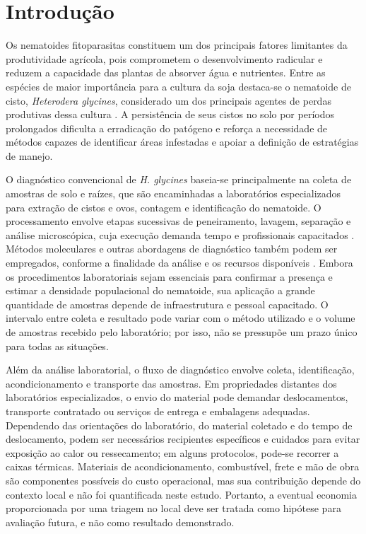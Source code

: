 \section{Introdução}

Os nematoides fitoparasitas constituem um dos principais fatores limitantes da produtividade agrícola, pois comprometem o desenvolvimento radicular e reduzem a capacidade das plantas de absorver água e nutrientes. Entre as espécies de maior importância para a cultura da soja destaca-se o nematoide de cisto, \textit{Heterodera glycines}, considerado um dos principais agentes de perdas produtivas dessa cultura \cite{bent2022}. A persistência de seus cistos no solo por períodos prolongados dificulta a erradicação do patógeno e reforça a necessidade de métodos capazes de identificar áreas infestadas e apoiar a definição de estratégias de manejo.

O diagnóstico convencional de \textit{H. glycines} baseia-se principalmente na coleta de amostras de solo e raízes, que são encaminhadas a laboratórios especializados para extração de cistos e ovos, contagem e identificação do nematoide. O processamento envolve etapas sucessivas de peneiramento, lavagem, separação e análise microscópica, cuja execução demanda tempo e profissionais capacitados \cite{arjoune2022,mahecha2022,pun2024}. Métodos moleculares e outras abordagens de diagnóstico também podem ser empregados, conforme a finalidade da análise e os recursos disponíveis \cite{shao2023}. Embora os procedimentos laboratoriais sejam essenciais para confirmar a presença e estimar a densidade populacional do nematoide, sua aplicação a grande quantidade de amostras depende de infraestrutura e pessoal capacitado. O intervalo entre coleta e resultado pode variar com o método utilizado e o volume de amostras recebido pelo laboratório; por isso, não se pressupõe um prazo único para todas as situações.

Além da análise laboratorial, o fluxo de diagnóstico envolve coleta, identificação, acondicionamento e transporte das amostras. Em propriedades distantes dos laboratórios especializados, o envio do material pode demandar deslocamentos, transporte contratado ou serviços de entrega e embalagens adequadas. Dependendo das orientações do laboratório, do material coletado e do tempo de deslocamento, podem ser necessários recipientes específicos e cuidados para evitar exposição ao calor ou ressecamento; em alguns protocolos, pode-se recorrer a caixas térmicas. Materiais de acondicionamento, combustível, frete e mão de obra são componentes possíveis do custo operacional, mas sua contribuição depende do contexto local e não foi quantificada neste estudo. Portanto, a eventual economia proporcionada por uma triagem no local deve ser tratada como hipótese para avaliação futura, e não como resultado demonstrado.

